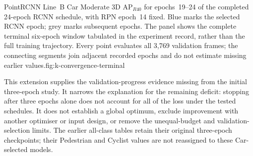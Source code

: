 {PointRCNN Line~B Car Moderate 3D AP$_{R40}$ for epochs~19--24
of the completed 24-epoch RCNN schedule, with RPN epoch~14 fixed.
Blue marks the selected RCNN epoch; grey marks subsequent epochs.
The panel shows the complete terminal six-epoch window tabulated in
the experiment record, rather than the full training trajectory.
Every point evaluates all 3,769 validation frames; the connecting
segments join adjacent recorded epochs and do not estimate missing
earlier values.}{fig:k-convergence-terminal}

This extension supplies the validation-progress evidence missing from
the initial three-epoch study. It narrows the explanation for the
remaining deficit: stopping after three epochs alone does not account
for all of the loss under the tested schedules. It does not establish
a global optimum, exclude improvement with another optimiser or input
design, or remove the unequal-budget and validation-selection limits.
The earlier all-class tables retain their original three-epoch
checkpoints; their Pedestrian and Cyclist values are not reassigned
to these Car-selected models.
